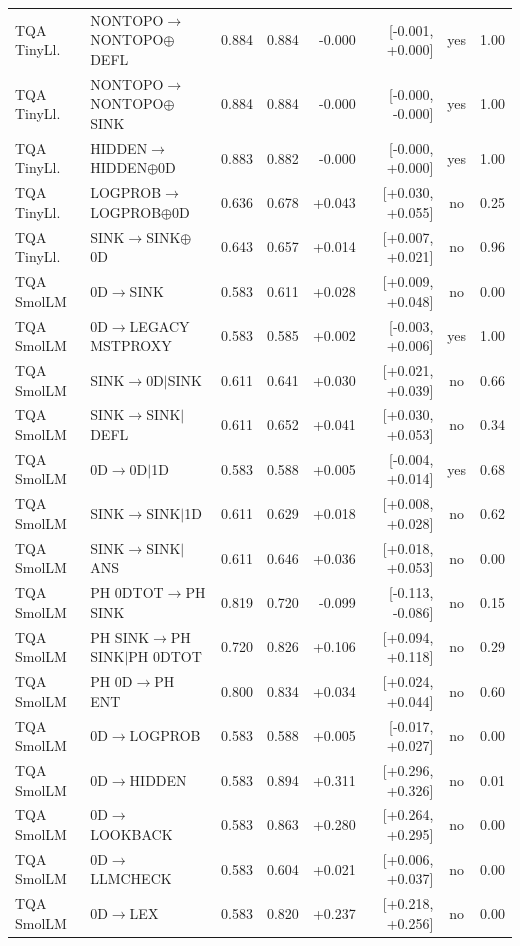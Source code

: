 \begin{longtable}{llrrrrcc}
TQA TinyLl. & NONTOPO$\to$NONTOPO$\oplus$DEFL & 0.884 & 0.884 & -0.000 & [-0.001, +0.000] & yes & 1.00 \\
TQA TinyLl. & NONTOPO$\to$NONTOPO$\oplus$SINK & 0.884 & 0.884 & -0.000 & [-0.000, -0.000] & yes & 1.00 \\
TQA TinyLl. & HIDDEN$\to$HIDDEN$\oplus$0D & 0.883 & 0.882 & -0.000 & [-0.000, +0.000] & yes & 1.00 \\
TQA TinyLl. & LOGPROB$\to$LOGPROB$\oplus$0D & 0.636 & 0.678 & +0.043 & [+0.030, +0.055] & no & 0.25 \\
TQA TinyLl. & SINK$\to$SINK$\oplus$0D & 0.643 & 0.657 & +0.014 & [+0.007, +0.021] & no & 0.96 \\
TQA SmolLM & 0D$\to$SINK & 0.583 & 0.611 & +0.028 & [+0.009, +0.048] & no & 0.00 \\
TQA SmolLM & 0D$\to$LEGACY MSTPROXY & 0.583 & 0.585 & +0.002 & [-0.003, +0.006] & yes & 1.00 \\
TQA SmolLM & SINK$\to$0D$\mid$SINK & 0.611 & 0.641 & +0.030 & [+0.021, +0.039] & no & 0.66 \\
TQA SmolLM & SINK$\to$SINK$\mid$DEFL & 0.611 & 0.652 & +0.041 & [+0.030, +0.053] & no & 0.34 \\
TQA SmolLM & 0D$\to$0D$\mid$1D & 0.583 & 0.588 & +0.005 & [-0.004, +0.014] & yes & 0.68 \\
TQA SmolLM & SINK$\to$SINK$\mid$1D & 0.611 & 0.629 & +0.018 & [+0.008, +0.028] & no & 0.62 \\
TQA SmolLM & SINK$\to$SINK$\mid$ANS & 0.611 & 0.646 & +0.036 & [+0.018, +0.053] & no & 0.00 \\
TQA SmolLM & PH 0DTOT$\to$PH SINK & 0.819 & 0.720 & -0.099 & [-0.113, -0.086] & no & 0.15 \\
TQA SmolLM & PH SINK$\to$PH SINK$\mid$PH 0DTOT & 0.720 & 0.826 & +0.106 & [+0.094, +0.118] & no & 0.29 \\
TQA SmolLM & PH 0D$\to$PH ENT & 0.800 & 0.834 & +0.034 & [+0.024, +0.044] & no & 0.60 \\
TQA SmolLM & 0D$\to$LOGPROB & 0.583 & 0.588 & +0.005 & [-0.017, +0.027] & no & 0.00 \\
TQA SmolLM & 0D$\to$HIDDEN & 0.583 & 0.894 & +0.311 & [+0.296, +0.326] & no & 0.01 \\
TQA SmolLM & 0D$\to$LOOKBACK & 0.583 & 0.863 & +0.280 & [+0.264, +0.295] & no & 0.00 \\
TQA SmolLM & 0D$\to$LLMCHECK & 0.583 & 0.604 & +0.021 & [+0.006, +0.037] & no & 0.00 \\
TQA SmolLM & 0D$\to$LEX & 0.583 & 0.820 & +0.237 & [+0.218, +0.256] & no & 0.00 \\

\end{longtable}
